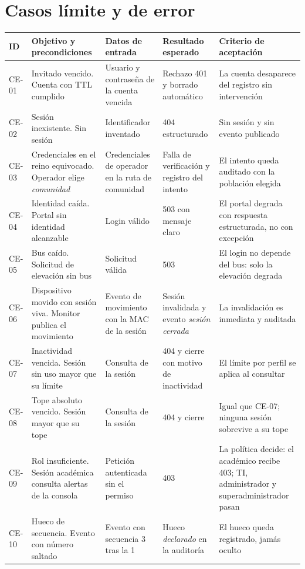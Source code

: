 \documentclass[11pt,a4paper]{article}
\begin{document}
\section{Casos límite y de error}

\begin{longtable}{p{1.1cm}p{3.4cm}p{3.2cm}p{3.4cm}p{3.2cm}}
\toprule
\textbf{ID} & \textbf{Objetivo y precondiciones} & \textbf{Datos de entrada} & \textbf{Resultado esperado} & \textbf{Criterio de aceptación}\\
\midrule
CE-01 & Invitado vencido. Cuenta con TTL cumplido & Usuario y contraseña de la cuenta vencida & Rechazo 401 y borrado automático & La cuenta desaparece del registro sin intervención\\
CE-02 & Sesión inexistente. Sin sesión & Identificador inventado & 404 estructurado & Sin sesión y sin evento publicado\\
CE-03 & Credenciales en el reino equivocado. Operador elige \emph{comunidad} & Credenciales de operador en la ruta de comunidad & Falla de verificación y registro del intento & El intento queda auditado con la población elegida\\
CE-04 & Identidad caída. Portal sin identidad alcanzable & Login válido & 503 con mensaje claro & El portal degrada con respuesta estructurada, no con excepción\\
CE-05 & Bus caído. Solicitud de elevación sin bus & Solicitud válida & 503 & El login no depende del bus: solo la elevación degrada\\
CE-06 & Dispositivo movido con sesión viva. Monitor publica el movimiento & Evento de movimiento con la MAC de la sesión & Sesión invalidada y evento \emph{sesión cerrada} & La invalidación es inmediata y auditada\\
CE-07 & Inactividad vencida. Sesión sin uso mayor que su límite & Consulta de la sesión & 404 y cierre con motivo de inactividad & El límite por perfil se aplica al consultar\\
CE-08 & Tope absoluto vencido. Sesión mayor que su tope & Consulta de la sesión & 404 y cierre & Igual que CE-07; ninguna sesión sobrevive a su tope\\
CE-09 & Rol insuficiente. Sesión académica consulta alertas de la consola & Petición autenticada sin el permiso & 403 & La política decide: el académico recibe 403; TI, administrador y superadministrador pasan\\
CE-10 & Hueco de secuencia. Evento con número saltado & Evento con secuencia 3 tras la 1 & Hueco \emph{declarado} en la auditoría & El hueco queda registrado, jamás oculto\\
\bottomrule
\end{longtable}
\end{document}
